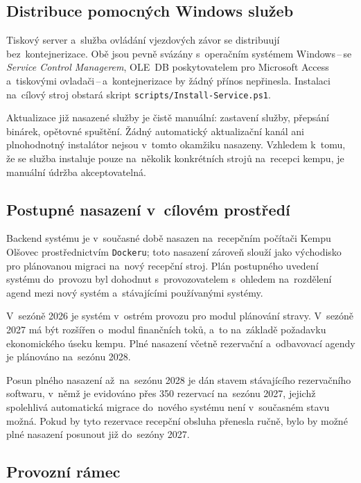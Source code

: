 \subsection{Distribuce pomocných Windows služeb}
\label{subsec:deploy-windows}

Tiskový server a~služba ovládání vjezdových závor se distribuují bez~kontejnerizace.
Obě jsou pevně svázány s~operačním systémem Windows\,--\,se \emph{Service Control Managerem}, OLE~DB poskytovatelem pro Microsoft Access a~tiskovými ovladači\,--\,a~kontejnerizace by žádný přínos nepřinesla.
Instalaci na~cílový stroj obstará skript \texttt{scripts/Install-Service.ps1}.

Aktualizace již nasazené služby je čistě manuální: zastavení služby, přepsání binárek, opětovné spuštění.
Žádný automatický aktualizační kanál ani plnohodnotný instalátor  nejsou v~tomto okamžiku nasazeny.
Vzhledem k~tomu, že se služba instaluje pouze na~několik konkrétních strojů na~recepci kempu, je manuální údržba akceptovatelná.

\subsection{Postupné nasazení v~cílovém prostředí}
\label{subsec:deploy-rollout}

Backend systému je v~současné době nasazen na~recepčním počítači Kempu Olšovec prostřednictvím \texttt{Dockeru}; toto nasazení zároveň slouží jako východisko pro plánovanou migraci na~nový recepční stroj.
Plán postupného uvedení systému do~provozu byl dohodnut s~provozovatelem s~ohledem na~rozdělení agend mezi nový systém a~stávajícími používanými systémy.

V~sezóně 2026 je systém v~ostrém provozu pro modul plánování stravy.
V~sezóně 2027 má být rozšířen o~modul finančních toků, a~to na~základě požadavku ekonomického úseku kempu.
Plné nasazení včetně rezervační a~odbavovací agendy je plánováno na~sezónu 2028.

Posun plného nasazení až~na~sezónu 2028 je dán stavem stávajícího rezervačního softwaru, v~němž je evidováno přes 350 rezervací na~sezónu 2027, jejichž spolehlivá automatická migrace do~nového systému není v~současném stavu možná.
Pokud by tyto rezervace recepční obsluha přenesla ručně, bylo by možné plné nasazení posunout již do~sezóny 2027.

\subsection{Provozní rámec}
\label{subsec:deploy-gaps}


